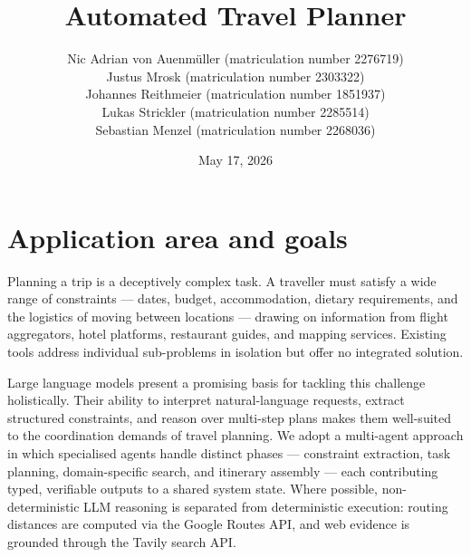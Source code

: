 \documentclass[a4paper,oneside,bibliography=totoc]{scrbook}
\begin{document}
\frontmatter \subject{Final Report} %
\title{Automated Travel Planner}
\author{
{Nic Adrian von Auenmüller (matriculation number 2276719)}\\
{Justus Mrosk (matriculation number 2303322)}\\
{Johannes Reithmeier (matriculation number 1851937)}\\
{Lukas Strickler (matriculation number 2285514)}\\
{Sebastian Menzel (matriculation number 2268036)}\\
}
\date{May 17, 2026}
\publishers{{\small Submitted to}\\
  Data and Web Science Group\\
  Prof.\ Dr.\ Christian Bizer\\
  University of Mannheim\\}
\maketitle

\begingroup%
\hypersetup{hidelinks}%
\tableofcontents%
\endgroup

\mainmatter


\chapter{Application area and goals}
\label{sec:intro}
Planning a trip is a deceptively complex task. A traveller must satisfy a wide range of constraints — dates, budget, accommodation, dietary requirements, and the logistics of moving between locations — drawing on information from flight aggregators, hotel platforms, restaurant guides, and mapping services. Existing tools address individual sub-problems in isolation but offer no integrated solution.

Large language models present a promising basis for tackling this challenge holistically. Their ability to interpret natural-language requests, extract structured constraints, and reason over multi-step plans makes them well-suited to the coordination demands of travel planning. We adopt a multi-agent approach in which specialised agents handle distinct phases — constraint extraction, task planning, domain-specific search, and itinerary assembly — each contributing typed, verifiable outputs to a shared system state. Where possible, non-deterministic LLM reasoning is separated from deterministic execution: routing distances are computed via the Google Routes API, and web evidence is grounded through the Tavily search API.
\end{document}
